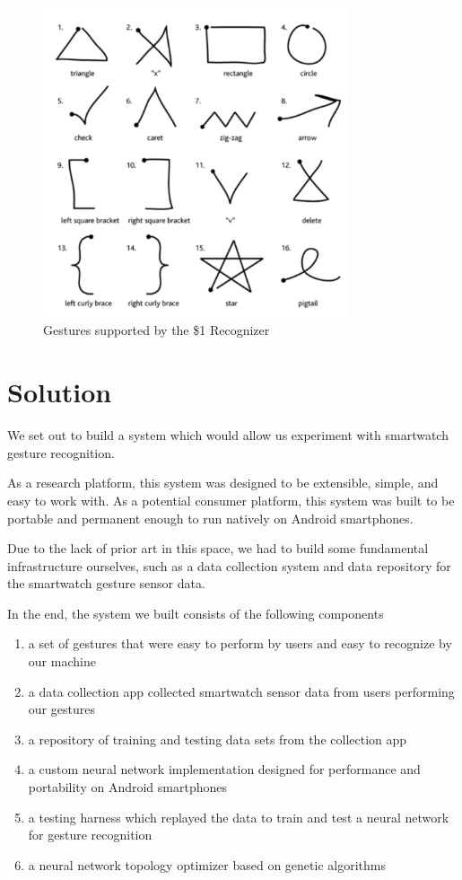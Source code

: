 \documentclass{report}
\begin{document}
\begin{figure}[ht!]
  \label{gestures}
  \centering
  \includegraphics[width=90mm]{gestures}
  \caption{Gestures supported by the \$1 Recognizer}
\end{figure}

\chapter{Solution}


We set out to build a system which would allow us experiment with smartwatch gesture recognition.

As a research platform, this system was designed to be extensible, simple, and easy to work with. As a potential consumer platform, this system was built to be portable and permanent enough to run natively on Android smartphones.

Due to the lack of prior art in this space, we had to build some fundamental infrastructure ourselves, such as a data collection system and data repository for the smartwatch gesture sensor data.

In the end, the system we built consists of the following components
\begin{enumerate}
\item a set of gestures that were easy to perform by users and easy to recognize by our machine
\item a data collection app collected smartwatch sensor data from users performing our gestures
\item a repository of training and testing data sets from the collection app
\item a custom neural network implementation designed for performance and portability on Android smartphones
\item a testing harness which replayed the data to train and test a neural network for gesture recognition
\item a neural network topology optimizer based on genetic algorithms
\end{enumerate}
\end{document}
